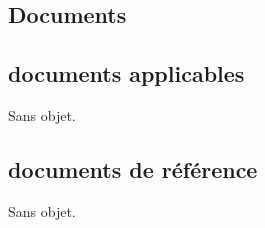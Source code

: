 \textcolor[RGB]{46, 116, 181}{\chapter{Documents}}
\section{documents applicables}
Sans objet.
\section{documents de référence}
Sans objet.
%
\setenumerate{}
